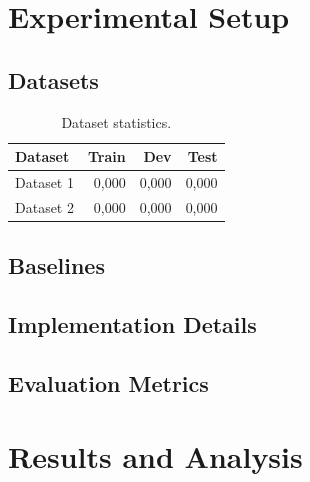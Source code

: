 \documentclass[11pt,a4paper]{article}
\begin{document}

\section{Experimental Setup}
\label{sec:setup}

\subsection{Datasets}
\label{sec:setup-data}

\begin{table}[t]
  \centering
  \caption{Dataset statistics.}
  \label{tab:datasets}
  \begin{tabular}{lrrr}
    \toprule
    \textbf{Dataset} & \textbf{Train} & \textbf{Dev} & \textbf{Test} \\
    \midrule
    Dataset 1 & 0,000 & 0,000 & 0,000 \\
    Dataset 2 & 0,000 & 0,000 & 0,000 \\
    \bottomrule
  \end{tabular}
\end{table}

\subsection{Baselines}
\label{sec:setup-baselines}

\subsection{Implementation Details}
\label{sec:setup-impl}

\subsection{Evaluation Metrics}
\label{sec:setup-metrics}

\section{Results and Analysis}
\label{sec:results}
\end{document}
